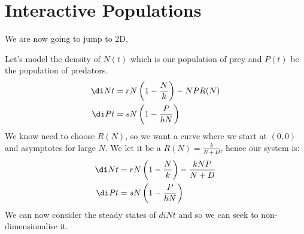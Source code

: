 \section{Interactive Populations}
We are now going to jump to 2D,
\begin{eg}
  Let's model the density of  $N(t)$ which is our population of prey and $P(t)$ be the population of predators.
  \begin{align*}
    \di N t &= rN\left( 1 - \frac{N }{k} \right) - NPR(N)\\
    \di P t &= sN \left( 1 - \frac{P }{hN} \right)
  \end{align*}
  We know need to choose $R(N)$, so we want a curve where we start at $(0, 0)$ and asymptotes for large $N$. We let it be a $R(N) = \frac{k }{N + D}$, hence our system is:
  \begin{align*}
    \di N t &= rN\left( 1 - \frac{N }{k} \right) - \frac{kNP}{N + D}\\
    \di P t &= sN \left( 1 - \frac{P }{hN} \right)
  \end{align*}
  We can now consider the steady states of $di N t$ and so we can seek to non-dimensionalise it. 
\end{eg}
